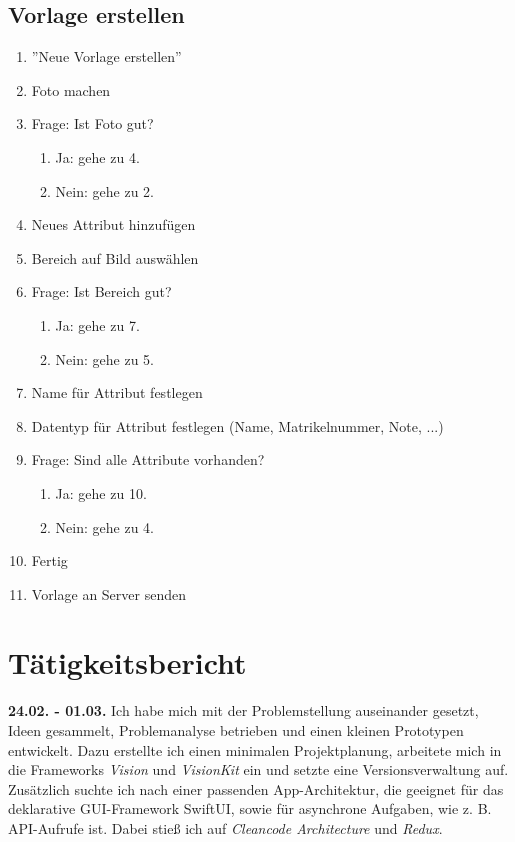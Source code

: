 \documentclass[nomenclature, oneside, 150]{HSMW-Thesis}
\begin{document}
	\section*{Vorlage erstellen}
	\begin{enumerate}
		\item ''Neue Vorlage erstellen''
		\item Foto machen
		\item Frage: Ist Foto gut? 
		\begin{enumerate}
			\item Ja: gehe zu 4.
			\item Nein: gehe zu 2.
		\end{enumerate}
		\item Neues Attribut hinzufügen
		\item Bereich auf Bild auswählen
		\item Frage: Ist Bereich gut?
		\begin{enumerate}
			\item Ja: gehe zu 7.
			\item Nein: gehe zu 5.
		\end{enumerate}
		\item Name für Attribut festlegen
		\item Datentyp für Attribut festlegen (Name, Matrikelnummer, Note, ...)
		\item Frage: Sind alle Attribute vorhanden?
		\begin{enumerate}
			\item Ja: gehe zu 10.
			\item Nein: gehe zu 4.
		\end{enumerate}
		\item Fertig
		\item Vorlage an Server senden
	\end{enumerate}
	

\chapter{Tätigkeitsbericht}
	\textbf{24.02. - 01.03.}
	Ich habe mich mit der Problemstellung auseinander gesetzt, Ideen gesammelt, Problemanalyse betrieben und einen kleinen Prototypen entwickelt. Dazu erstellte ich einen minimalen Projektplanung, arbeitete mich in die Frameworks \textit{Vision} und \textit{VisionKit} ein und setzte eine Versionsverwaltung auf. Zusätzlich suchte ich nach einer passenden App-Architektur, die geeignet für das deklarative GUI-Framework SwiftUI, sowie für asynchrone Aufgaben, wie z. B. API-Aufrufe ist. Dabei stieß ich auf \textit{Cleancode Architecture} und \textit{Redux}.
	
\end{document}
